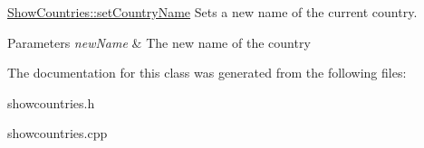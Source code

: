 \hyperlink{class_show_countries_aefa9daeff484f4028ea5a280b280dd36}{Show\+Countries\+::set\+Country\+Name} Sets a new name of the current country. 


\begin{DoxyParams}{Parameters}
{\em new\+Name} & The new name of the country \\
\hline
\end{DoxyParams}


The documentation for this class was generated from the following files\+:\begin{DoxyCompactItemize}
\item 
showcountries.\+h\item 
showcountries.\+cpp\end{DoxyCompactItemize}

